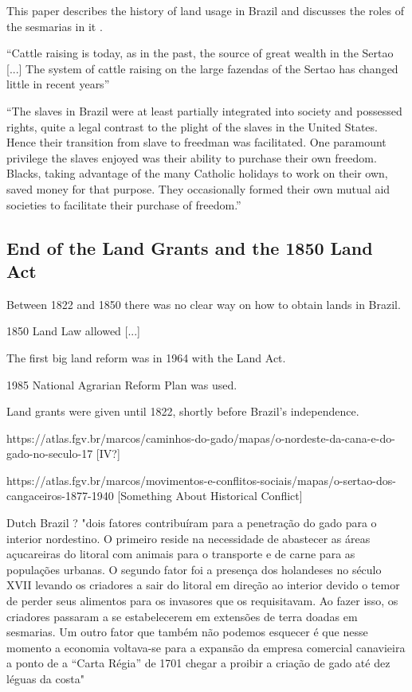 \documentclass{article}
\begin{document}
This paper describes the history of land usage in Brazil and discusses the roles of the sesmarias in it \parencite{Reydon2015-ff}.

\textcite[p.~157]{De_Oliveira_Andrade1980-xz}
``Cattle raising is today, as in the past, the source of great wealth in the Sertao [...] The system of cattle raising on the large fazendas of the Sertao has changed little in recent years''

``The slaves in Brazil were at least partially integrated into society and possessed rights, quite a legal contrast to the plight of the slaves in the United States. Hence their transition from slave to freedman was facilitated. One paramount privilege the slaves enjoyed was their ability to purchase their
own freedom. Blacks, taking advantage of the many Catholic holidays to work on their own, saved money for that purpose. They occasionally formed their own mutual aid societies to facilitate their purchase of freedom.''

\subsection{End of the Land Grants and the 1850 Land Act}

Between 1822 and 1850 there was no clear way on how to obtain lands in Brazil.

1850 Land Law allowed [...]

The first big land reform was in 1964 with the Land Act.

1985 National Agrarian Reform Plan was used.

Land grants were given until 1822, shortly before Brazil's independence.

https://atlas.fgv.br/marcos/caminhos-do-gado/mapas/o-nordeste-da-cana-e-do-gado-no-seculo-17 [IV?]

https://atlas.fgv.br/marcos/movimentos-e-conflitos-sociais/mapas/o-sertao-dos-cangaceiros-1877-1940 [Something About Historical Conflict]

Dutch Brazil ? "dois fatores contribuíram para a penetração do gado para o interior nordestino. O primeiro reside na necessidade de abastecer as áreas açucareiras do litoral com animais para o transporte e de carne para as populações urbanas. O segundo fator foi a presença dos holandeses no século XVII levando os criadores a sair do litoral em direção ao interior devido o temor de perder seus alimentos para os invasores que os requisitavam. Ao fazer isso, os criadores passaram a se estabelecerem em extensões de terra doadas em sesmarias. Um outro fator que também não podemos esquecer é que nesse momento a economia voltava-se para a expansão da empresa comercial canavieira a ponto de a “Carta Régia” de 1701 chegar a proibir a criação de gado até dez léguas da costa" 
\end{document}
